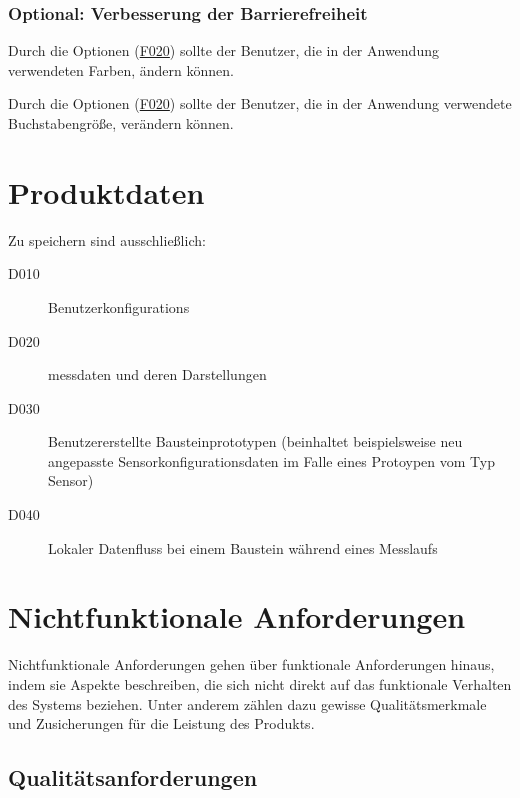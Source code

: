 \documentclass[parskip=full]{scrartcl}
\begin{document}
\subsubsection{Optional: Verbesserung der Barrierefreiheit}

\begin{description}

\hypertarget{link-f510}{\item[(opt.) F510]} Durch die Optionen (\hyperlink{link-f020}{F020}) sollte der Benutzer, die in der Anwendung verwendeten Farben, ändern können.
\hypertarget{link-f520}{\item[(opt.) F520]} Durch die Optionen (\hyperlink{link-f020}{F020}) sollte der Benutzer, die in der Anwendung verwendete Buchstabengröße, verändern können.

\end{description}

\clearpage
\section{Produktdaten}\label{produktdaten}

Zu speichern sind ausschließlich:

\begin{description}

\item[D010] \glspl{Benutzerkonfiguration}
\item[D020] \gls{messdaten} und deren Darstellungen
\item[D030] Benutzererstellte Bausteinprototypen (beinhaltet beispielsweise neu angepasste Sensorkonfigurationsdaten im Falle eines Protoypen vom Typ Sensor)
\item[D040] Lokaler Datenfluss bei einem Baustein während eines Messlaufs 

\end{description}

\clearpage
\section{Nichtfunktionale Anforderungen}\label{nichtfunktionale}

Nichtfunktionale Anforderungen gehen über funktionale Anforderungen hinaus, indem sie Aspekte beschreiben, die sich nicht direkt auf das funktionale Verhalten des Systems beziehen. Unter anderem zählen dazu gewisse Qualitätsmerkmale und Zusicherungen für die Leistung des Produkts.

\subsection{Qualitätsanforderungen}\label{quali}
\end{document}
